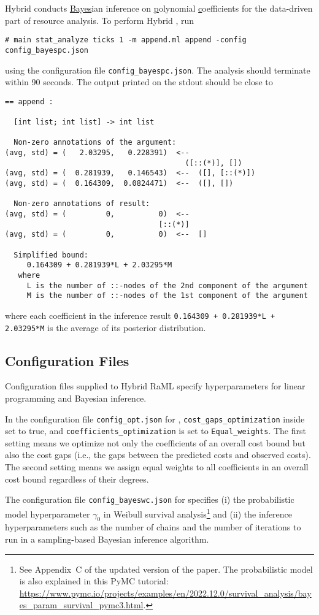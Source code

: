 Hybrid \BayesPC{} conducts \underline{Bayes}ian inference on
\underline{p}olynomial \underline{c}oefficients for the data-driven part of
resource analysis.
%
To perform Hybrid \BayesPC{}, run
\begin{verbatim}
# main stat_analyze ticks 1 -m append.ml append -config config_bayespc.json
\end{verbatim}
using the configuration file \texttt{config\_bayespc.json}.
%
The analysis should terminate within 90 seconds.
%
The output printed on the stdout should be close to
\begin{verbatim}
== append :

  [int list; int list] -> int list

  Non-zero annotations of the argument:
(avg, std) = (   2.03295,   0.228391)  <--
                                         ([::(*)], [])
(avg, std) = (  0.281939,   0.146543)  <--  ([], [::(*)])
(avg, std) = (  0.164309,  0.0824471)  <--  ([], [])

  Non-zero annotations of result:
(avg, std) = (         0,          0)  <--
                                   [::(*)]
(avg, std) = (         0,          0)  <--  []

  Simplified bound:
     0.164309 + 0.281939*L + 2.03295*M
   where
     L is the number of ::-nodes of the 2nd component of the argument
     M is the number of ::-nodes of the 1st component of the argument
\end{verbatim}
where each coefficient in the inference result \texttt{0.164309 + 0.281939*L +
  2.03295*M} is the average of its posterior distribution.

\subsection{Configuration Files}

Configuration files supplied to Hybrid RaML specify hyperparameters for
linear programming and Bayesian inference.

In the configuration file \texttt{config\_opt.json} for \Opt{},
\texttt{cost\_gaps\_optimization} inside set to true, and
\texttt{coefficients\_optimization} is set to \texttt{Equal\_weights}.
%
The first setting means we optimize not only the coefficients of an overall cost
bound but also the cost gaps (i.e., the gaps between the predicted costs and
observed costs).
%
The second setting means we assign equal weights to all coefficients in an
overall cost bound regardless of their degrees.

The configuration file \texttt{config\_bayeswc.json} for \BayesWC{} specifies
(i) the probabilistic model hyperparameter $\gamma_0$ in Weibull survival
analysis\footnote{See Appendix~C of the updated version of the paper. The
probabilistic model is also explained in this PyMC tutorial:
\url{https://www.pymc.io/projects/examples/en/2022.12.0/survival_analysis/bayes_param_survival_pymc3.html}.}
and (ii) the inference hyperparameters such as the number of chains and the
number of iterations to run in a sampling-based Bayesian inference algorithm.

